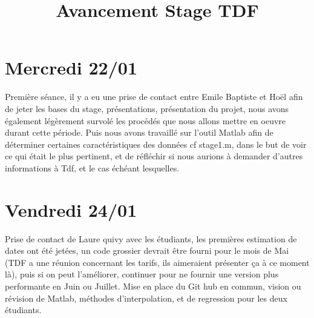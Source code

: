 \documentclass[a4paper, 11pt]{article}
\begin{document}
\title{Avancement Stage TDF}
\maketitle

\section{Mercredi 22/01}

Première séance, il y a eu une prise de contact entre Emile Baptiste et Hoël afin de jeter les bases du stage, présentations, présentation du projet, nous avons également légèrement survolé les procédés que nous allons mettre en oeuvre durant cette période.
   Puis nous avons travaillé sur l'outil Matlab afin de déterminer certaines caractéristiques des données cf stage1.m, dans le but de voir ce qui était le plus pertinent, et de réfléchir si nous aurions à demander d'autres informations à Tdf, et le cas échéant lesquelles.

\section{Vendredi 24/01}

Prise de contact de Laure quivy avec les étudiants, les premières estimation de dates ont été jetées, un code grossier devrait être fourni pour le mois de Mai (TDF a une réunion concernant les tarifs, ils aimeraient présenter ça à ce moment là), puis si on peut l'améliorer, continuer pour ne fournir une version plus performante en Juin ou Juillet.
Mise en place du Git hub en commun, vision ou révision de Matlab, méthodes d'interpolation, et de regression pour les deux étudiants.
\end{document}
